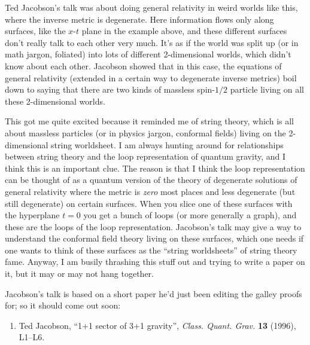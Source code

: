 \documentclass{article}
\def\tightlist{}
\begin{document}
\begin{itemize}
  Ted Jacobson's talk was about doing general relativity in weird worlds
  like this, where the inverse metric is degenerate. Here information
  flows only along surfaces, like the \(x\)-\(t\) plane in the example
  above, and these different surfaces don't really talk to each other
  very much. It's as if the world was split up (or in math jargon,
  foliated) into lots of different 2-dimensional worlds, which didn't
  know about each other. Jacobson showed that in this case, the
  equations of general relativity (extended in a certain way to
  degenerate inverse metrics) boil down to saying that there are two
  kinds of massless spin-\(1/2\) particle living on all these
  2-dimensional worlds.

  This got me quite excited because it reminded me of string theory,
  which is all about massless particles (or in physics jargon, conformal
  fields) living on the 2-dimensional string worldsheet. I am always
  hunting around for relationships between string theory and the loop
  representation of quantum gravity, and I think this is an important
  clue. The reason is that I think the loop representation can be
  thought of as a quantum version of the theory of degenerate solutions
  of general relativity where the metric is \emph{zero} most places and
  less degenerate (but still degenerate) on certain surfaces. When you
  slice one of these surfaces with the hyperplane \(t = 0\) you get a
  bunch of loops (or more generally a graph), and these are the loops of
  the loop representation. Jacobson's talk may give a way to understand
  the conformal field theory living on these surfaces, which one needs
  if one wants to think of these surfaces as the ``string worldsheets''
  of string theory fame. Anyway, I am busily thrashing this stuff out
  and trying to write a paper on it, but it may or may not hang
  together.

  Jacobson's talk is based on a short paper he'd just been editing the
  galley proofs for; so it should come out soon:

  \begin{enumerate}
  \def\labelenumi{\arabic{enumi})}
  \setcounter{enumi}{1}
  \tightlist
  \item
    Ted Jacobson, ``1+1 sector of 3+1 gravity'', \emph{Class. Quant.
    Grav.} \textbf{13} (1996), L1--L6.
  \end{enumerate}


\end{itemize}
\end{document}

